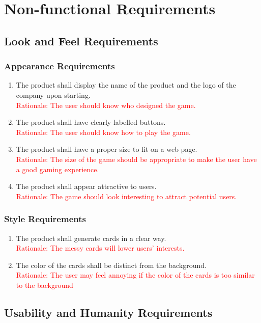 \documentclass[12pt, titlepage]{article}
\begin{document}
\FloatBarrier
\section{Non-functional Requirements}

\subsection{Look and Feel Requirements}
\subsubsection{Appearance Requirements}
\begin{enumerate}
    \item The product shall display the name of the product and the logo of the company upon starting.\\
   \textcolor{red}{Rationale: The user should know who designed the game.}
    \item The product shall have clearly labelled buttons.\\
    \textcolor{red}{Rationale: The user should know how to play the game.}
    \item The product shall have a proper size to fit on a web page.\\
    \textcolor{red}{Rationale: The size of the game should be appropriate to make the user have a good gaming experience.}
    \item The product shall appear attractive to users.\\
    \textcolor{red}{Rationale: The game should look interesting to attract potential users.}
\end{enumerate}

\subsubsection{Style Requirements}
\begin{enumerate}
    \item The product shall generate cards in a clear way.\\
    \textcolor{red}{Rationale: The messy cards will lower users' interests.}
    \item The color of the cards shall be distinct from the background. \\
    \textcolor{red}{Rationale: The user may feel annoying if the color of the cards is too similar to the background}
\end{enumerate}
\subsection{Usability and Humanity Requirements}
\end{document}
